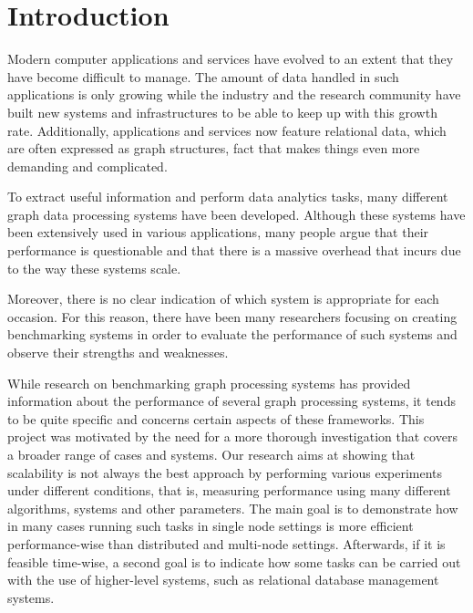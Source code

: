 \documentclass[a4paper,11pt]{article}
\begin{document}

\section{Introduction} \label{introduction}


\par Modern computer applications and services have evolved to an extent that they have become difficult to manage. The amount of data handled in such applications is only growing while the industry and the research community have built new systems and infrastructures to be able to keep up with this growth rate. Additionally, applications and services now feature relational data, which are often expressed as graph structures, fact that makes things even more demanding and complicated.

\medskip

\par To extract useful information and perform data analytics tasks, many different graph data processing systems have been developed. Although these systems have been extensively used in various applications, many people argue that their performance is questionable and that there is a massive overhead that incurs due to the way these systems scale.

\medskip

\par Moreover, there is no clear indication of which system is appropriate for each occasion. For this reason, there have been many researchers focusing on creating benchmarking systems in order to evaluate the performance of such systems and observe their strengths and weaknesses.

\medskip

\par While research on benchmarking graph processing systems has provided information about the performance of several graph processing systems, it tends to be quite specific and concerns certain aspects of these frameworks. This project was motivated by the need for a more thorough investigation that covers a broader range of cases and systems. Our research aims at showing that scalability is not always the best approach by performing various experiments under different conditions, that is, measuring performance using many different algorithms, systems and other parameters. The main goal is to demonstrate how in many cases running such tasks in single node settings is more efficient performance-wise than distributed and multi-node settings. Afterwards, if it is feasible time-wise, a second goal is to indicate how some tasks can be carried out with the use of higher-level systems, such as relational database management systems.
\end{document}
